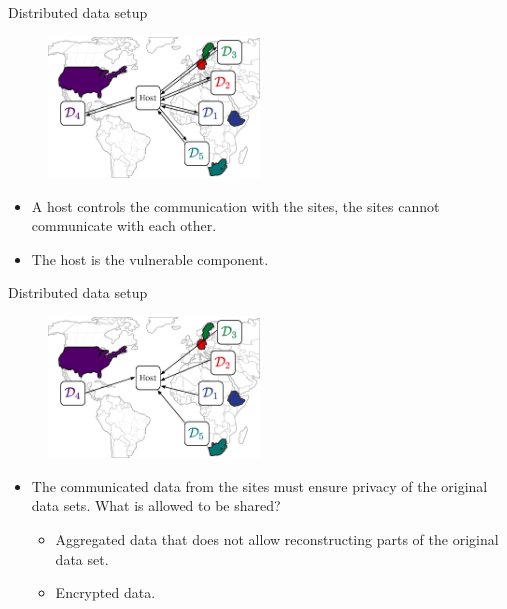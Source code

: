 \documentclass[t,10pt]{beamer}
\begin{document}
\begin{frame}{Distributed data setup}
  \begin{figure}
    \centering
    \includegraphics[width=0.5\textwidth]{figures/fig-sites-host.png}
  \end{figure}
  \begin{itemize}
    \item A host controls the communication with the sites, the sites cannot communicate with each other.
    \item The host is the vulnerable component.%
  \end{itemize}
  \addtocounter{framenumber}{-1}
\end{frame}

\begin{frame}{Distributed data setup}
  \begin{figure}
    \centering
    \includegraphics[width=0.5\textwidth]{figures/fig-sites-host2.png}
  \end{figure}
  \begin{itemize}
    \item The communicated data from the sites must ensure privacy of the original data sets.
  What is allowed to be shared?
  \begin{itemize}
    \item Aggregated data that does not allow reconstructing parts of the original data set.
    \item Encrypted data.%
  \end{itemize}
  \end{itemize}
  \addtocounter{framenumber}{-1}
\end{frame}
\end{document}
